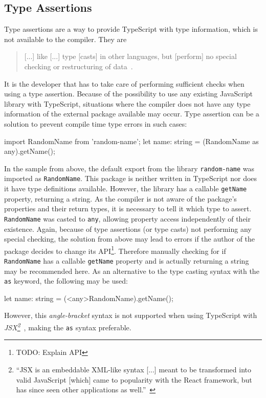 \subsection{Type Assertions}
\label{sec:ts-type-assertions}

Type assertions are a way to provide TypeScript with type information, which is not available to the compiler. They are 
\begin{quote}
  [...] like [...] type [casts] in other languages, but [perform] no special checking or restructuring of data~\cite{TypeScriptHandbook:BasicTypes}.
\end{quote}
It is the developer that has to take care of performing sufficient checks when using a type assertion. Because of the possibility to use any existing JavaScript library with TypeScript, situations where the compiler does not have any type information of the external package available may occur. Type assertion can be a solution to prevent compile time type errors in such cases:
\begin{JsCode}[numbers=none]
import RandomName from 'random-name';
let name: string = (RandomName as any).getName();
\end{JsCode}
In the sample from above, the default export from the library \texttt{random-name} was imported as \texttt{RandomName}. This package is neither written in TypeScript nor does it have type definitions available. However, the library has a callable \texttt{getName} property, returning a string. As the compiler is not aware of the package's properties and their return types, it is necessary to tell it which type to assert. \texttt{RandomName} was casted to \texttt{any}, allowing property access independently of their existence. Again, because of type assertions (or type casts) not performing any special checking, the solution from above may lead to errors if the author of the package decides to change its API\footnote{TODO: Explain API}. Therefore manually checking for if \texttt{RandomName} has a callable \texttt{getName} property and is actually returning a string may be recommended here.
As an alternative to the type casting syntax with the \texttt{as} keyword, the following may be used:
\begin{JsCode}[numbers=none]
let name: string = (<any>RandomName).getName();
\end{JsCode}
However, this \emph{angle-bracket} syntax is not supported when using TypeScript with \emph{JSX\footnote{``JSX is an embeddable XML-like syntax [...] meant to be transformed into valid JavaScript [which] came to popularity with the React framework, but has since seen other applications as well.''~\cite{TypeScriptHandbook:JSX}}}~\cite{TypeScriptHandbook:BasicTypes}, making the \texttt{as} syntax preferable.


